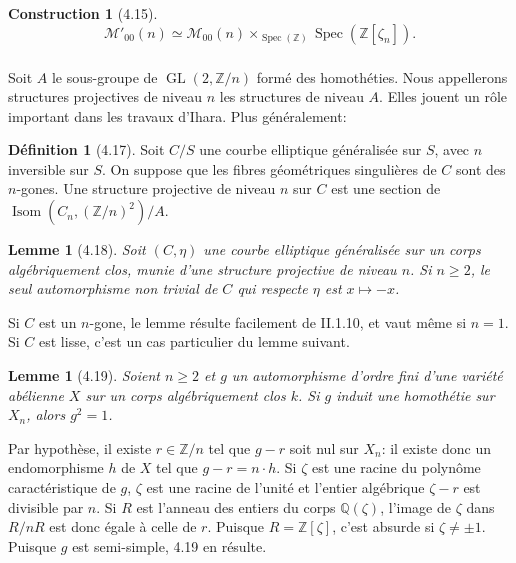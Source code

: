 \documentclass[11pt,a4paper]{amsart}
\theoremstyle{plain}
\newtheorem{lemma}[theorem]{Lemme}
\theoremstyle{definition}
\newtheorem{definition}[theorem]{D\'efinition}
\newtheorem{construction}[theorem]{Construction}
\DeclareMathOperator{\Isom}{Isom}
\DeclareMathOperator{\Spec}{Spec}
\DeclareMathOperator{\Gl}{GL}
\newcommand{\mll}{\mathcal{M}}
\newcommand{\ZZ}{\mathbb{Z}}
\newcommand{\QQ}{\mathbb{Q}}
\begin{document}
\begin{construction}[4.15]
\[
\mll'_{00}(n) \simeq \mll_{00}(n) \times_{\Spec(\ZZ)} \Spec(\ZZ[\zeta_n]).
\]
\end{construction}

\subsubsection{}
Soit $A$ le sous-groupe de $\Gl(2, \ZZ/n)$ form\'e des homoth\'eties. Nous appellerons structures projectives de niveau $n$ les structures de niveau $A$. Elles jouent un r\^ole important dans les travaux d'Ihara. Plus g\'en\'eralement:

\begin{definition}[4.17]
Soit $C/S$ une courbe elliptique g\'en\'eralis\'ee sur $S$, avec $n$ inversible sur $S$. On suppose que les fibres g\'eom\'etriques singuli\`eres de $C$ sont des $n$-gones. Une structure projective de niveau $n$ sur $C$ est une section de $\Isom(C_n, (\ZZ/n)^2)/A$.
\end{definition}

\begin{lemma}[4.18]
Soit $(C, \eta)$ une courbe elliptique g\'en\'eralis\'ee sur un corps alg\'ebriquement clos, munie d'une structure projective de niveau $n$. Si $n \geq 2$, le seul automorphisme non trivial de $C$ qui respecte $\eta$ est $x \mapsto -x$.
\end{lemma}

Si $C$ est un $n$-gone, le lemme r\'esulte facilement de II.1.10, et vaut m\^eme si $n=1$. Si $C$ est lisse, c'est un cas particulier du lemme suivant.

\begin{lemma}[4.19]
Soient $n \geq 2$ et $g$ un automorphisme d'ordre fini d'une vari\'et\'e ab\'elienne $X$ sur un corps alg\'ebriquement clos $k$. Si $g$ induit une homoth\'etie sur $X_n$, alors $g^2 = 1$.
\end{lemma}

Par hypoth\`ese, il existe $r \in \ZZ/n$ tel que $g-r$ soit nul sur $X_n$: il existe donc un endomorphisme $h$ de $X$ tel que $g - r = n \cdot h$. Si $\zeta$ est une racine du polyn\^ome caract\'eristique de $g$, $\zeta$ est une racine de l'unit\'e et l'entier alg\'ebrique $\zeta - r$ est divisible par $n$. Si $R$ est l'anneau des entiers du corps $\QQ(\zeta)$, l'image de $\zeta$ dans $R/nR$ est donc \'egale \`a celle de $r$. Puisque $R = \ZZ[\zeta]$, c'est absurde si $\zeta \neq \pm 1$. Puisque $g$ est semi-simple, 4.19 en r\'esulte.
\end{document}
